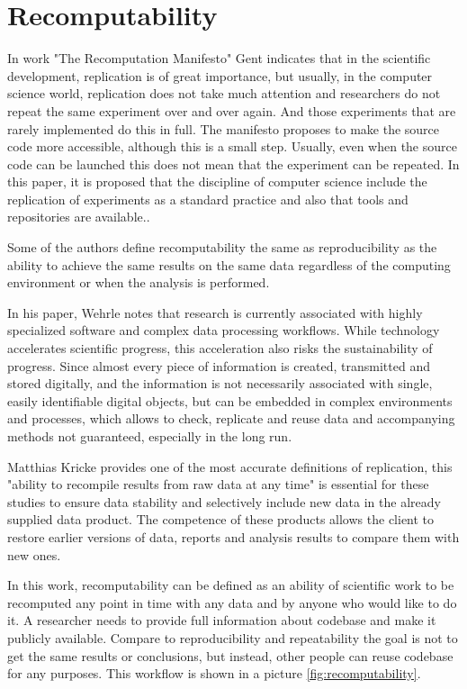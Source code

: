 \section{Recomputability}
In work "The Recomputation Manifesto"\cite{DBLP:journals/corr/abs-1304-3674} Gent indicates that in the scientific development, replication is of great importance, but usually, in the computer science world, replication does not take much attention and researchers do not repeat the same experiment over and over again. And those experiments that are rarely implemented do this in full. The manifesto proposes to make the source code more accessible, although this is a small step. Usually, even when the source code can be launched this does not mean that the experiment can be repeated. In this paper, it is proposed that the discipline of computer science include the replication of experiments as a standard practice and also that tools and repositories are available..\par
Some of the authors\cite{DBLP:conf/psb/KaushikISTDK17} define recomputability the same as reproducibility as the ability to achieve the same results on the same data regardless of the computing environment or when the analysis is performed.\par
In his paper\cite{DBLP:conf/ucc/WehrleLVR14}, Wehrle notes that research is currently associated with highly specialized software and complex data processing workflows. While technology accelerates scientific progress, this acceleration also risks the sustainability of progress. Since almost every piece of information is created, transmitted and stored digitally, and the information is not necessarily associated with single, easily identifiable digital objects, but can be embedded in complex environments and processes, which allows to check, replicate and reuse data and accompanying methods not guaranteed, especially in the long run.\par
Matthias Kricke\cite{DBLP:journals/dbsk/KrickeGS17} provides one of the most accurate definitions of replication, this "ability to recompile results from raw data at any time" is essential for these studies to ensure data stability and selectively include new data in the already supplied data product. The competence of these products allows the client to restore earlier versions of data, reports and analysis results to compare them with new ones.\par
In this work, recomputability can be defined as an ability of scientific work to be recomputed any point in time with any data and by anyone who would like to do it. A researcher needs to provide full information about codebase and make it publicly available. Compare to reproducibility and repeatability the goal is not to get the same results or conclusions, but instead, other people can reuse codebase for any purposes. This workflow is shown in a picture \ref{fig:recomputability}.\par
